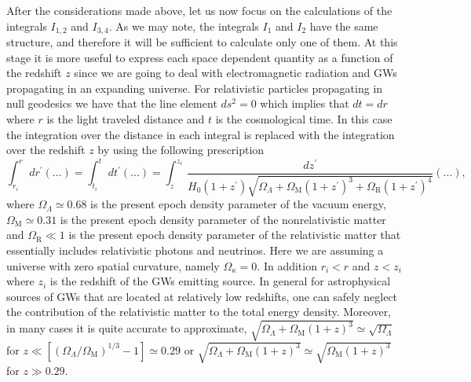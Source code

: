 \documentclass[a4paper,11pt]{article}
\begin{document}
After the considerations made above, let us now focus on the calculations of the integrals $I_{1, 2}$ and $I_{3, 4}$. As we may note, the integrals $I_1$ and $I_2$ have the same structure, and therefore it will be sufficient to calculate only one of them. %
At this stage it is more useful to express each space dependent quantity as a function of the redshift $z$ since we are going to deal with electromagnetic radiation and GWs propagating in an expanding universe. For relativistic particles propagating in null geodesics we have that the line element $ds^2=0$ which implies that $dt=dr$ where $r$ is the light traveled distance and $t$ is the cosmological time. In this case the integration over the distance in each integral is replaced with the integration over the redshift $z$ by using the following prescription
\begin{equation}\label{light-t-distance}
\int_{r_i}^r\, dr^\prime (...)=\int_{t_i}^t\, dt^\prime (...)=\int_{z}^{z_i}\,\frac{dz^{\prime}}{H_0(1+z^\prime)\sqrt{\Omega_\Lambda+\Omega_\text{M}(1+z^\prime)^3+\Omega_\text{R}(1+z^\prime)^4}} (...),
\end{equation}
where $\Omega_\Lambda\simeq 0.68$ is the present epoch density parameter of the vacuum energy, $\Omega_\text{M}\simeq 0.31$ is the present epoch density parameter of the nonrelativistic matter and $\Omega_\text{R}\ll 1$ is the present epoch density parameter of the relativistic matter that essentially includes relativistic photons and neutrinos. Here we are assuming a universe with zero spatial curvature, namely $\Omega_\kappa=0$. In addition $r_i<r$ and $z<z_i$ where $z_i$ is the redshift of the GWs emitting source. In general for astrophysical sources of GWs that are located at relatively low redshifts, one can safely neglect the contribution of the relativistic matter to the total energy density. Moreover, in many cases it is quite accurate to approximate, $\sqrt{\Omega_\Lambda +\Omega_\text{M}(1+z)^3}\simeq \sqrt{\Omega_\Lambda}$ for $z\ll \left[(\Omega_\Lambda/\Omega_\textrm{M})^{1/3}-1\right]\simeq 0.29$ or  $\sqrt{\Omega_\Lambda +\Omega_\text{M}(1+z)^3}\simeq \sqrt{\Omega_\textrm{M}(1+z)^3}$ for $z\gg 0.29$.
\end{document}
